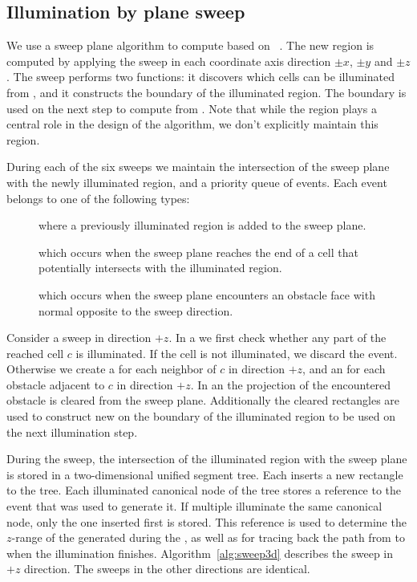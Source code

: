 \documentclass[english,gradu]{tktltiki2018}
\begin{document}
\subsection{Illumination by plane sweep}

We use a sweep plane algorithm to compute  based on ~\cite{restricted}.
The new region is computed by applying the sweep in each coordinate axis direction $\pm x$, $\pm y$ and $\pm z$.
The sweep performs two functions: it discovers which cells can be illuminated from , and it constructs the boundary of the illuminated region.
The boundary is used on the next step to compute  from .
Note that while the region  plays a central role in the design of the algorithm, we don't explicitly maintain this region.

During each of the six sweeps we maintain the intersection of the sweep plane with the newly illuminated region, and a priority queue of events.
Each event belongs to one of the following types:

\begin{description}
\item[\addE] where a previously illuminated region is added to the sweep plane.
\item[\cellE] which occurs when the sweep plane reaches the end of a cell that potentially intersects with the illuminated region.
\item[\obsE] which occurs when the sweep plane encounters an obstacle face with normal opposite to the sweep direction.
\end{description}

Consider a sweep in direction $+z$.
In a \cellE we first check whether any part of the reached cell $c$ is illuminated.
If the cell is not illuminated, we discard the event.
Otherwise we create a \cellE for each neighbor of $c$ in direction $+z$, and an \obsE for each obstacle adjacent to $c$ in direction $+z$.
In an \obsE the projection of the encountered obstacle is cleared from the sweep plane.
Additionally the cleared rectangles are used to construct new \addEs on the boundary of the illuminated region to be used on the next illumination step.

During the sweep, the intersection of the illuminated region with the sweep plane is stored in a two-dimensional unified segment tree.
Each \addE inserts a new rectangle to the tree.
Each illuminated canonical node of the tree stores a reference to the event that was used to generate it.
If multiple \addEs illuminate the same canonical node, only the one inserted first is stored.
This reference is used to determine the $z$-range of the \addEs generated during the \obsEs, as well as for tracing back the path from \ept to \spt when the illumination finishes.
Algorithm~\ref{alg:sweep3d} describes the sweep in $+z$ direction.
The sweeps in the other directions are identical.
\end{document}
